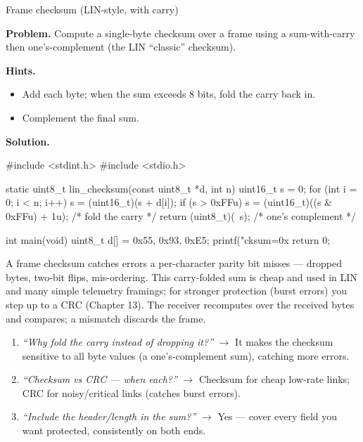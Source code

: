 \begin{gymproblem}{Frame checksum (LIN-style, with carry)}

\textbf{Problem.} Compute a single-byte checksum over a frame using a
sum-with-carry then one's-complement (the LIN ``classic'' checksum).

\textbf{Hints.}
\begin{itemize}
\item Add each byte; when the sum exceeds 8 bits, fold the carry back in.
\item Complement the final sum.
\end{itemize}

\attempt

\textbf{Solution.}
\begin{cgym}
#include <stdint.h>
#include <stdio.h>

static uint8_t lin_checksum(const uint8_t *d, int n) {
    uint16_t s = 0;
    for (int i = 0; i < n; i++) {
        s = (uint16_t)(s + d[i]);
        if (s > 0xFFu) s = (uint16_t)((s & 0xFFu) + 1u);   /* fold the carry */
    }
    return (uint8_t)(~s);                                  /* one's complement */
}

int main(void) {
    uint8_t d[] = {0x55, 0x93, 0xE5};
    printf("cksum=0x%
    return 0;
}
\end{cgym}

A frame checksum catches errors a per-character parity bit misses --- dropped
bytes, two-bit flips, mis-ordering. This carry-folded sum is cheap and used in
LIN and many simple telemetry framings; for stronger protection (burst errors)
you step up to a CRC (Chapter 13). The receiver recomputes over the received
bytes and compares; a mismatch discards the frame.

\followups
\begin{enumerate}
\item \emph{``Why fold the carry instead of dropping it?''} $\rightarrow$ It
  makes the checksum sensitive to all byte values (a one's-complement sum),
  catching more errors.
\item \emph{``Checksum vs CRC --- when each?''} $\rightarrow$ Checksum for cheap
  low-rate links; CRC for noisy/critical links (catches burst errors).
\item \emph{``Include the header/length in the sum?''} $\rightarrow$ Yes ---
  cover every field you want protected, consistently on both ends.
\end{enumerate}
\end{gymproblem}

